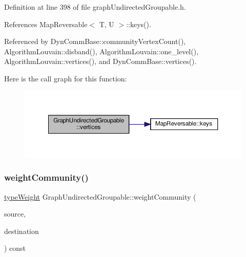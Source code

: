 Definition at line 398 of file graph\+Undirected\+Groupable.\+h.



References Map\+Reversable$<$ T, U $>$\+::keys().



Referenced by Dyn\+Comm\+Base\+::community\+Vertex\+Count(), Algorithm\+Louvain\+::disband(), Algorithm\+Louvain\+::one\+\_\+level(), Algorithm\+Louvain\+::vertices(), and Dyn\+Comm\+Base\+::vertices().

Here is the call graph for this function\+:
\nopagebreak
\begin{figure}[H]
\begin{center}
\leavevmode
\includegraphics[width=350pt]{classGraphUndirectedGroupable_aaa5e7db5ba0b5b87ed6af50ef958b9d7_cgraph}
\end{center}
\end{figure}
\mbox{\label{classGraphUndirectedGroupable_a2884361f00176ac8f16afca6feb3e404}} 
\subsubsection{\texorpdfstring{weight\+Community()}{weightCommunity()}}
{\footnotesize\ttfamily \hyperlink{edge_8h_a2e7ea3be891ac8b52f749ec73fee6dd2}{type\+Weight} Graph\+Undirected\+Groupable\+::weight\+Community (\begin{DoxyParamCaption}\item[{const \hyperlink{graphUndirectedGroupable_8h_a914da95c9ea7f14f4b7f875c36818556}{type\+Community} \&}]{source,  }\item[{const \hyperlink{graphUndirectedGroupable_8h_a914da95c9ea7f14f4b7f875c36818556}{type\+Community} \&}]{destination }\end{DoxyParamCaption}) const\hspace{0.3cm}{\ttfamily [inline]}}

